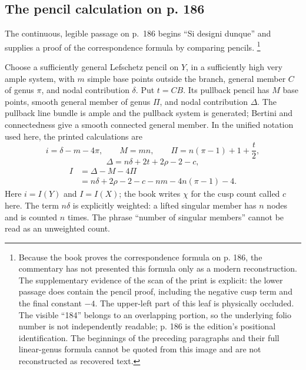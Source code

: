 \subsection{The pencil calculation on p. 186}

The continuous, legible passage on p.~186 begins ``Si designi dunque'' and supplies a proof of the correspondence formula by comparing pencils. \footnote{Because the book proves the correspondence formula on p. 186, the commentary has not
presented this formula only as a modern reconstruction. The supplementary
evidence of the scan of the print is explicit: the lower passage
does contain the pencil proof, including the negative cusp term and the
final constant $-4$. The upper-left part of this leaf is physically
occluded. The visible “184” belongs to an overlapping portion, so the
underlying folio number is not independently readable; p. 186 is the
edition's positional identification. The beginnings of the preceding
paragraphs and their full linear-genus formula cannot be quoted from this
image and are not reconstructed as recovered text.}

Choose a sufficiently general Lefschetz pencil on \(Y\), in a sufficiently high very ample system, with \(m\) simple base points outside the branch, general member \(C\) of genus \(\pi\), and nodal contribution \(\delta\). Put \(t=CB\). Its pullback pencil has \(M\) base points, smooth general member of genus \(\Pi\), and nodal contribution \(\Delta\). The pullback line bundle is ample and the pullback system is generated; Bertini and connectedness give a smooth connected general member. In the unified notation used here, the printed calculations are \[
i=\delta-m-4\pi,\qquad M=mn,\qquad
\Pi=n(\pi-1)+1+\frac t2,
\] \[
\Delta=n\delta+2t+2\rho-2-c,
\] \[
\begin{aligned}
I&=\Delta-M-4\Pi\\
 &=n\delta+2\rho-2-c-nm-4n(\pi-1)-4.
\end{aligned}
\] Here \(i=I(Y)\) and \(I=I(X)\); the book writes \(\chi\) for the cusp count called \(c\) here. The term \(n\delta\) is explicitly weighted: a lifted singular member has \(n\) nodes and is counted \(n\) times. The phrase ``number of singular members'' cannot be read as an unweighted count.

